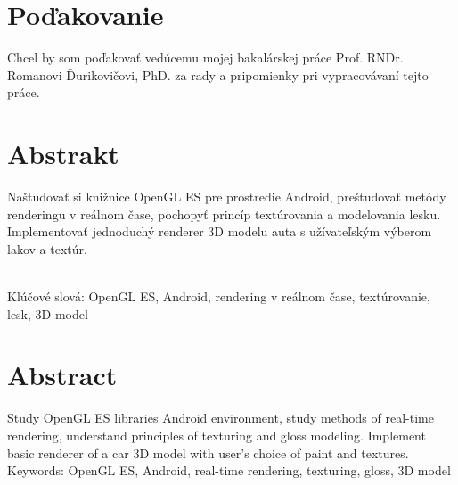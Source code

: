 \documentclass[12pt,a4paper,oneside]{bachelor} %
\begin{document}
\chapter*{Poďakovanie}\label{chap:dakovanie}
Chcel by som poďakovať vedúcemu mojej bakalárskej práce Prof. RNDr. Romanovi Ďurikovičovi, PhD. za rady a pripomienky pri vypracovávaní tejto práce.
\vfill\eject 

\chapter*{Abstrakt}\label{chap:abstrakt_sk}
Naštudovať si knižnice OpenGL ES pre prostredie Android, preštudovať metódy renderingu v reálnom čase, pochopyť princíp textúrovania a modelovania lesku. Implementovať jednoduchý renderer 3D modelu auta s užívateľským výberom lakov a textúr.

~\\
Kľúčové slová: OpenGL ES, Android, rendering v reálnom čase, textúrovanie, lesk, 3D model
\vfill\eject 

\chapter*{Abstract}\label{chap:abstrakt_en}
Study OpenGL ES libraries Android environment, study methods of real-time rendering, understand principles of texturing and gloss modeling. Implement basic renderer of a car 3D model with user's choice of paint and textures.\textbf{
}
~\\
Keywords: OpenGL ES, Android, real-time rendering, texturing, gloss, 3D model
\vfill\eject 



\tableofcontents

\listoffigures







\nocite{*}


\end{document}
